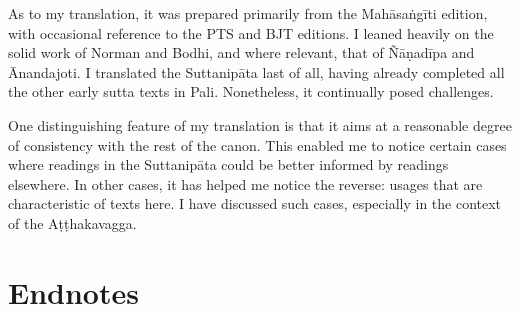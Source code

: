 \documentclass[12pt,openany]{book}%
\begin{document}
As to my translation, it was prepared primarily from the \textsanskrit{Mahāsaṅgīti} edition, with occasional reference to the PTS and BJT editions. I leaned heavily on the solid work of Norman and Bodhi, and where relevant, that of \textsanskrit{Ñāṇadīpa} and Ānandajoti. I translated the \textsanskrit{Suttanipāta} last of all, having already completed all the other early sutta texts in Pali. Nonetheless, it continually posed challenges.

One distinguishing feature of my translation is that it aims at a reasonable degree of consistency with the rest of the canon. This enabled me to notice certain cases where readings in the \textsanskrit{Suttanipāta} could be better informed by readings elsewhere. In other cases, it has helped me notice the reverse: usages that are characteristic of texts here. I have discussed such cases, especially in the context of the \textsanskrit{Aṭṭhakavagga}.

\chapter*{Endnotes}
\end{document}
